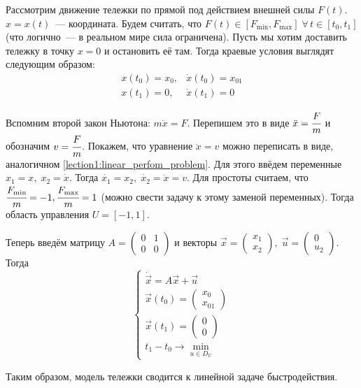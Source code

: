 Рассмотрим движение тележки по прямой под действием внешней силы $F(t)$.
$x = x(t)$~--- координата.
Будем считать, что $F(t) \in [F_{\min}, F_{\max}] \; \forall \, t \in [t_0, t_1]$ (что логично~--- в реальном мире сила ограничена).
Пусть мы хотим доставить тележку в точку $x = 0$ и остановить её там.
Тогда краевые условия выглядят следующим образом:
\begin{equation}
    \begin{array}{cc}
        x(t_0) = x_0, & \dot{x}(t_0) = x_{01} \\
        x(t_1) = 0, & \dot{x}(t_1) = 0
    \end{array}
\end{equation}

Вспомним второй закон Ньютона: $m\ddot{x} = F$.
Перепишем это в виде $\ddot{x} = \cfrac{F}{m}$ и обозначим $v = \cfrac{F}{m}$.
Покажем, что уравнение $\ddot{x} = v$ можно переписать в виде, аналогичном \ref{lection1:linear_perfom_problem}.
Для этого ввёдем переменные $x_1 = x, \; x_2 = \dot{x}$.
Тогда $\dot{x_1} = x_2, \; \dot{x_2} = \ddot{x} = v$.
Для простоты считаем, что $\cfrac{F_{\min}}{m} = -1, \cfrac{F_{\max}}{m} = 1$ (можно свести задачу к этому заменой переменных).
Тогда область управления $U = [-1, 1]$.

Теперь введём матрицу $A = \left( \begin{matrix} 
    0 & 1 \\
    0 & 0 
\end{matrix} \right)$ и векторы ${\vec{x} = \left(\begin{matrix} x_1 \\ x_2 \end{matrix}\right)}, \;
                                 {\vec{u} = \left( \begin{matrix} 0 \\ u_2 \end{matrix} \right)}$.
Тогда 
\begin{equation}
    \begin{cases}
        \dot{\vec{x}} = A\vec{x} + \vec{u} \\
        \vec{x}(t_0) = \left( 
            \begin{matrix}
                x_0 \\
                x_{01}
            \end{matrix} 
        \right)\\
        \vec{x}(t_1) = \left( 
            \begin{matrix}
                0 \\
                0
            \end{matrix} 
        \right)\\
        t_1 - t_0 \rightarrow \min\limits_{u \in D_U}
    \end{cases}
\end{equation}

Таким образом, модель тележки сводится к линейной задаче быстродействия.
